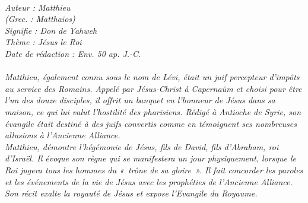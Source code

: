 \BFont
\noindent\hrulefill
{\footnotesize
\textit{
\bigskip
{\centering{}
\\Auteur : Matthieu
\\(Grec. : Matthaios)
\\Signifie : Don de Yahweh
\\Thème : Jésus le Roi
\\Date de rédaction : Env. 50 ap. J.-C.\\}
}
\textit{
\\Matthieu, également connu sous le nom de Lévi, était un juif percepteur d’impôts au service des Romains. Appelé par
Jésus-Christ à Capernaüm et choisi pour être l’un des douze disciples, il offrit un banquet en l’honneur de Jésus dans
sa maison, ce qui lui valut l’hostilité des pharisiens. Rédigé à Antioche de Syrie, son évangile était destiné à des juifs
convertis comme en témoignent ses nombreuses allusions à l’Ancienne Alliance.
\\Matthieu, démontre l’hégémonie de Jésus, fils de David, fils d’Abraham, roi d’Israël. Il évoque son règne qui se manifestera un jour physiquement, lorsque le Roi jugera tous les hommes du «~trône de sa gloire~». Il fait concorder les paroles et les événements de la vie de Jésus avec les prophéties de l’Ancienne Alliance.
\\Son récit exalte la royauté de Jésus et expose l’Evangile du Royaume.\bigskip
}
}
\par\nobreak\noindent\hrulefill
